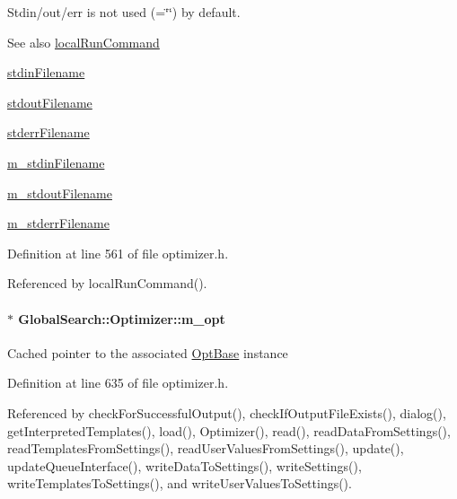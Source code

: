 Stdin/out/err is not used (=\char`\"{}\char`\"{}) by default.

\begin{DoxySeeAlso}{See also}
\hyperlink{classGlobalSearch_1_1Optimizer_aed5eb285d45a001c9520c2ed3a5b57a1}{local\+Run\+Command} 

\hyperlink{classGlobalSearch_1_1Optimizer_a5964a9b38d3ae90c8ac36a75d3a35832}{stdin\+Filename} 

\hyperlink{classGlobalSearch_1_1Optimizer_a217750aa50431f9948aa8164fb99de0c}{stdout\+Filename} 

\hyperlink{classGlobalSearch_1_1Optimizer_acaa83cc6bf1dcc263b92450b4f8cb652}{stderr\+Filename} 

\hyperlink{classGlobalSearch_1_1Optimizer_aca91d12d7aecae052d6ab5ae158acec6}{m\+\_\+stdin\+Filename} 

\hyperlink{classGlobalSearch_1_1Optimizer_a5ed04fdd5f8b511249e408adcd174550}{m\+\_\+stdout\+Filename} 

\hyperlink{classGlobalSearch_1_1Optimizer_a75b800a7f90a03d551f6795404d0c8f1}{m\+\_\+stderr\+Filename} 
\end{DoxySeeAlso}


Definition at line 561 of file optimizer.\+h.



Referenced by local\+Run\+Command().

\hypertarget{classGlobalSearch_1_1Optimizer_a689df6e2c0d8bbfff99585ca54199696}{}
\paragraph[{m\+\_\+opt}]{$\ast$ Global\+Search\+::\+Optimizer\+::m\+\_\+opt\hspace{0.3cm}{\ttfamily [protected]}}\label{classGlobalSearch_1_1Optimizer_a689df6e2c0d8bbfff99585ca54199696}
Cached pointer to the associated \hyperlink{classGlobalSearch_1_1OptBase}{Opt\+Base} instance 

Definition at line 635 of file optimizer.\+h.



Referenced by check\+For\+Successful\+Output(), check\+If\+Output\+File\+Exists(), dialog(), get\+Interpreted\+Templates(), load(), Optimizer(), read(), read\+Data\+From\+Settings(), read\+Templates\+From\+Settings(), read\+User\+Values\+From\+Settings(), update(), update\+Queue\+Interface(), write\+Data\+To\+Settings(), write\+Settings(), write\+Templates\+To\+Settings(), and write\+User\+Values\+To\+Settings().

